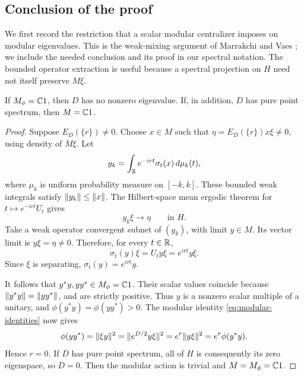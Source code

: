 \subsection{Conclusion of the proof}

We first record the restriction that a scalar modular centralizer imposes
on modular eigenvalues. This is the weak-mixing argument of
Marrakchi and Vaes \cite[Lemma~2.1]{MarrakchiVaes2024}; we include the
needed conclusion and its proof in our spectral notation. The bounded
operator extraction is useful because a spectral projection on $H$ need
not itself preserve $M\xi$.

\begin{lemma}
\label{spec:eigenvalues}
If $M_\phi=\mathbb C1$, then $D$ has no nonzero eigenvalue. If, in addition, $D$
has pure point spectrum, then $M=\mathbb C1$.
\end{lemma}

\begin{proof}
Suppose $E_D(\{r\})\neq0$. Choose $x\in M$ such that
$\eta=E_D(\{r\})x\xi\neq0$, using density of $M\xi$. Let
\[
 y_k=\int_{\mathbb R}e^{-irt}\sigma_t(x)\,d\mu_k(t),
\]
where $\mu_k$ is uniform probability measure on $[-k,k]$. These bounded
weak integrals satisfy $\lVert y_k\rVert\leq\lVert x\rVert$. The Hilbert-space mean
ergodic theorem for $t\mapsto e^{-irt}U_t$ gives
\[
 y_k\xi\longrightarrow\eta\qquad\text{in }H.
\]
Take a weak operator convergent subnet of $(y_k)$, with limit $y\in M$.
Its vector limit is $y\xi=\eta\neq0$. Therefore, for every $t\in\mathbb R$,
\[
 \sigma_t(y)\xi=U_ty\xi=e^{irt}y\xi.
\]
Since $\xi$ is separating, $\sigma_t(y)=e^{irt}y$.

It follows that $y^*y,yy^*\in M_\phi=\mathbb C1$. Their scalar values coincide
because $\lVert y^*y\rVert=\lVert yy^*\rVert$, and are strictly positive. Thus $y$ is
a nonzero scalar multiple of a unitary, and
$\phi(y^*y)=\phi(yy^*)>0$. The modular identity
\eqref{eq:modular-identities} now gives
\[
 \phi(yy^*)
   =\lVert\xi y\rVert^2
   =\lVert e^{D/2}y\xi\rVert^2
   =e^r\lVert y\xi\rVert^2
   =e^r\phi(y^*y).
\]
Hence $r=0$. If $D$ has pure point spectrum, all of $H$ is consequently
its zero eigenspace, so $D=0$. Then the modular action is trivial and
$M=M_\phi=\mathbb C1$.
\end{proof}


